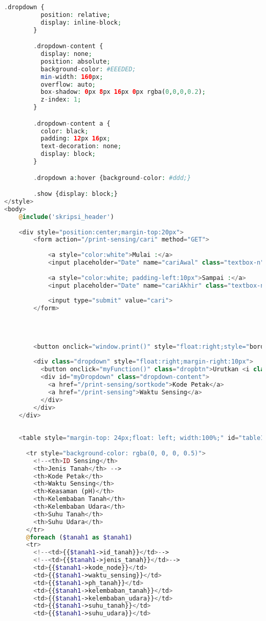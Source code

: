 \begin{lstlisting}[language=PHP, caption=skripsi\_perangkat.blade.php]
        .dropdown {
          position: relative;
          display: inline-block;
        }

        .dropdown-content {
          display: none;
          position: absolute;
          background-color: #EEEDED;
          min-width: 160px;
          overflow: auto;
          box-shadow: 0px 8px 16px 0px rgba(0,0,0,0.2);
          z-index: 1;
        }

        .dropdown-content a {
          color: black;
          padding: 12px 16px;
          text-decoration: none;
          display: block;
        }

        .dropdown a:hover {background-color: #ddd;}

        .show {display: block;}
</style>
<body>
    @include('skripsi_header')
    
    <div style="position:center;margin-top:20px">
        <form action="/print-sensing/cari" method="GET">
            
            <a style="color:white">Mulai :</a> 
            <input placeholder="Date" name="cariAwal" class="textbox-n" type="text" onfocus="(this.type='date')" id="date" value="{{ old('cariAwal') }}">
            
            <a style="color:white; padding-left:10px">Sampai :</a>
            <input placeholder="Date" name="cariAkhir" class="textbox-n" type="text" onfocus="(this.type='date')" id="date" value="{{ old('cariAkhir') }}">
            
            <input type="submit" value="cari">
        </form>
        
                    
        
              
        <button onclick="window.print()" style="float:right;style="border-radius:5px;"">Print</button>
        
        <div class="dropdown" style="float:right;margin-right:10px">
          <button onclick="myFunction()" class="dropbtn">Urutkan <i class="fas fa-angle-down"></i> </button>
          <div id="myDropdown" class="dropdown-content">
            <a href="/print-sensing/sortkode">Kode Petak</a>
            <a href="/print-sensing">Waktu Sensing</a>
          </div>
        </div>
    </div>
    
    
    <table style="margin-top: 24px;float: left; width:100%;" id="table1">
    
      <tr style="background-color: rgba(0, 0, 0, 0.5)">
        <!--<th>ID Sensing</th>
        <th>Jenis Tanah</th> -->
        <th>Kode Petak</th> 
        <th>Waktu Sensing</th> 
        <th>Keasaman (pH)</th> 
        <th>Kelembaban Tanah</th> 
        <th>Kelembaban Udara</th> 
        <th>Suhu Tanah</th> 
        <th>Suhu Udara</th> 
      </tr>
      @foreach ($tanah1 as $tanah1)
      <tr>
        <!--<td>{{$tanah1->id_tanah}}</td>-->
        <!--<td>{{$tanah1->jenis_tanah}}</td>-->
        <td>{{$tanah1->kode_node}}</td>
        <td>{{$tanah1->waktu_sensing}}</td>
        <td>{{$tanah1->ph_tanah}}</td>
        <td>{{$tanah1->kelembaban_tanah}}</td>
        <td>{{$tanah1->kelembaban_udara}}</td>
        <td>{{$tanah1->suhu_tanah}}</td>
        <td>{{$tanah1->suhu_udara}}</td>
    

\end{lstlisting}
